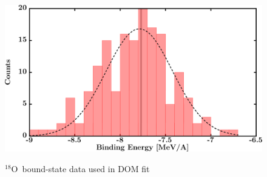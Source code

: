 \documentclass[twocolumn,secnumarabic,amssymb, nobibnotes, aps, prl,
superscriptaddress, nobalancelastpage, draft]{revtex4}
\newcommand{\oEight}{\ensuremath{^{18}}O}
\begin{document}
\begin{figure}[!htb]
\begin{minipage}{0.4\linewidth}
        \label{DOM_o18_RMSRadius}
    \end{minipage}
    \begin{minipage}{0.4\linewidth}
        \centering
        \includegraphics[width=\linewidth]{figures/o18_BE.png}
        \label{DOM_o18_BE}
    \end{minipage}
    \caption{\oEight\ bound-state data used in DOM fit}
    \label{DOM_o18_structural}
\end{figure}
\end{document}
